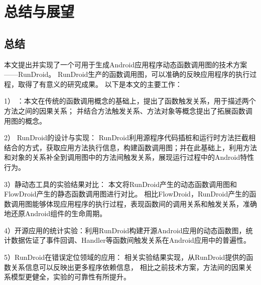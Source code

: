 \chapter{总结与展望}
\label{chp:future}
\section{总结}


本文提出并实现了一个可用于生成Android应用程序动态函数调用图的技术方案——RunDroid。
RunDroid生产的函数调用图，可以准确的反映应用程序的执行过程，取得了有意义的研究成果。
以下是本文的主要工作：


1） \ecg：本文在传统的函数调用概念的基础上，提出了函数触发关系，用于描述两个方法之间的因果关系；
并结合方法触发关系、方法对象等概念提出了拓展函数调用图的概念。

2） RunDroid的设计与实现：
RunDroid利用源程序代码插桩和运行时方法拦截相结合的方式，获取应用方法执行信息，构建函数调用图；并在此基础上，利用方法和对象的关系补全到调用图中的方法间触发关系，展现运行过程中的Android特性行为。


3）静动态工具的实验结果对比：
本文将RunDroid产生的动态函数调用图和FlowDroid产生的静态函数调用图进行对比。
相比FlowDroid，RunDroid产生的函数调用图能够体现应用程序的执行过程，表现函数间的调用关系和触发关系，准确地还原Android组件的生命周期。

4）开源应用的统计实验：利用RunDroid构建开源Android应用的动态函数图，统计数据佐证了事件回调、Handler等函数间触发关系在Android应用中的普遍性。



5）RunDroid在错误定位领域的应用：
相关实验结果实现，从RunDroid提供的函数关系信息可以反映出更多程序依赖信息，
相比之前技术方案，方法间的因果关系模型更健全，实验的可靠性有所提升。









